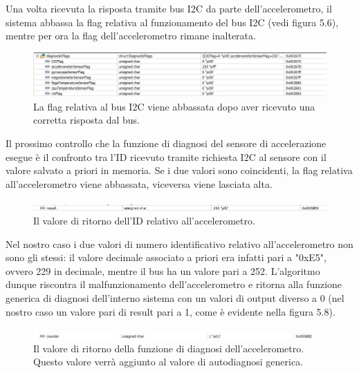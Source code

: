 \documentclass[LaM,binding=0.6cm]{../sapthesis}
\begin{document}
Una volta ricevuta la risposta tramite bus I2C da parte dell'accelerometro, il sistema abbassa la flag relativa al funzionamento del bus I2C (vedi figura 5.6), mentre per ora la flag dell'accelerometro rimane inalterata.\newline

\begin{figure}[htbp]
\centerline{\includegraphics[scale=0.6]{examples/3_accelerometerI2CGoodConnection.JPG}}
\caption{La flag relativa al bus I2C viene abbassata dopo aver ricevuto una corretta risposta dal bus.}
\label{fig}
\end{figure}

Il prossimo controllo che la funzione di diagnosi del sensore di accelerazione esegue è il confronto tra l'ID ricevuto tramite richiesta I2C al sensore con il valore salvato a priori in memoria. Se i due valori sono coincidenti, la flag relativa all'accelerometro viene abbassata, viceversa viene lasciata alta.\newline

\begin{figure}[htbp]
\centerline{\includegraphics[scale=0.65]{examples/4_badAccelerometerId.JPG}}
\caption{Il valore di ritorno dell'ID relativo all'accelerometro.}
\label{fig}
\end{figure}

Nel nostro caso i due valori di numero identificativo relativo all'accelerometro non sono gli stessi: il valore decimale associato a priori era infatti pari a "0xE5", ovvero 229 in decimale, mentre il bus ha un valore pari a 252. L'algoritmo dunque riscontra il malfunzionamento dell'accelerometro e ritorna alla funzione generica di diagnosi dell'interno sistema con un valori di output diverso a 0 (nel nostro caso un valore pari di result pari a 1, come è evidente nella figura 5.8).\newline

\begin{figure}[htbp]
\centerline{\includegraphics[scale=0.6]{examples/5_accelerometerCounter.JPG}}
\caption{Il valore di ritorno della funzione di diagnosi dell'accelerometro. Questo valore verrà aggiunto al valore di autodiagnosi generica.}
\label{fig}
\end{figure}
\end{document}
